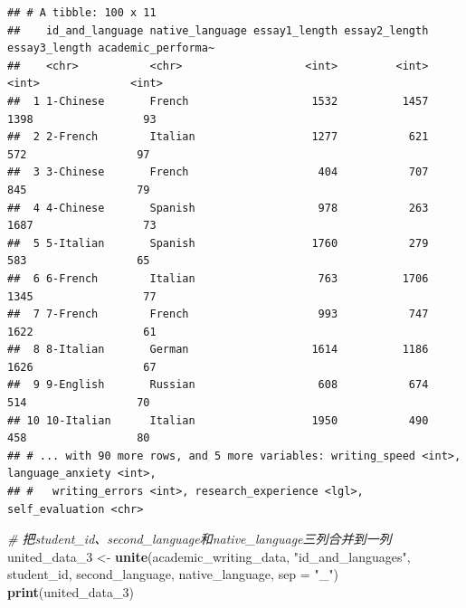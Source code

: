 \documentclass[]{book}
\newenvironment{Shaded}{\begin{snugshade}}{\end{snugshade}}
\newcommand{\CommentTok}[1]{\textcolor[rgb]{0.56,0.35,0.01}{\textit{#1}}}
\newcommand{\DataTypeTok}[1]{\textcolor[rgb]{0.13,0.29,0.53}{#1}}
\newcommand{\DecValTok}[1]{\textcolor[rgb]{0.00,0.00,0.81}{#1}}
\newcommand{\KeywordTok}[1]{\textcolor[rgb]{0.13,0.29,0.53}{\textbf{#1}}}
\newcommand{\NormalTok}[1]{#1}
\newcommand{\StringTok}[1]{\textcolor[rgb]{0.31,0.60,0.02}{#1}}
\begin{document}
\begin{verbatim}
## # A tibble: 100 x 11
##    id_and_language native_language essay1_length essay2_length essay3_length academic_performa~
##    <chr>           <chr>                   <int>         <int>         <int>              <int>
##  1 1-Chinese       French                   1532          1457          1398                 93
##  2 2-French        Italian                  1277           621           572                 97
##  3 3-Chinese       French                    404           707           845                 79
##  4 4-Chinese       Spanish                   978           263          1687                 73
##  5 5-Italian       Spanish                  1760           279           583                 65
##  6 6-French        Italian                   763          1706          1345                 77
##  7 7-French        French                    993           747          1622                 61
##  8 8-Italian       German                   1614          1186          1626                 67
##  9 9-English       Russian                   608           674           514                 70
## 10 10-Italian      Italian                  1950           490           458                 80
## # ... with 90 more rows, and 5 more variables: writing_speed <int>, language_anxiety <int>,
## #   writing_errors <int>, research_experience <lgl>, self_evaluation <chr>
\end{verbatim}

\begin{Shaded}
\begin{Highlighting}[]
\CommentTok{# 把student_id、second_language和native_language三列合并到一列}
\NormalTok{united_data_}\DecValTok{3}\NormalTok{ <-}\StringTok{ }\KeywordTok{unite}\NormalTok{(academic_writing_data, }\StringTok{"id_and_languages"}\NormalTok{, student_id, second_language, native_language, }\DataTypeTok{sep =} \StringTok{"_"}\NormalTok{)}
\KeywordTok{print}\NormalTok{(united_data_}\DecValTok{3}\NormalTok{)}
\end{Highlighting}
\end{Shaded}
\end{document}
